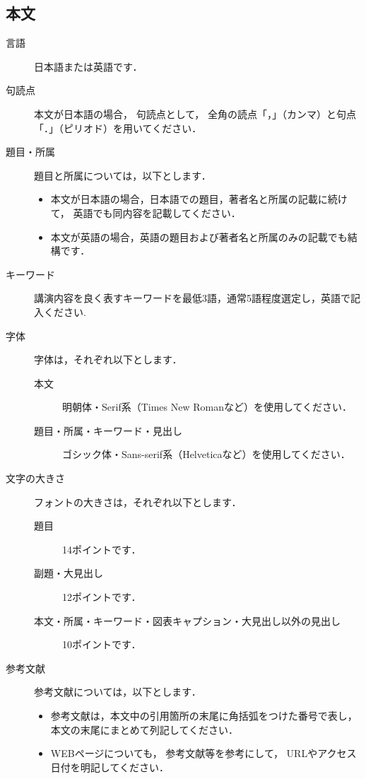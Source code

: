 \documentclass{ltjoc}
\begin{document}
\subsection{本文}
\begin{description}
\item [言語]
  日本語または英語です．
\item [句読点]
  本文が日本語の場合，
  句読点として，
  全角の読点「，」（カンマ）と句点「．」（ピリオド）を用いてください． 
\item [題目・所属]
  題目と所属については，以下とします．
  \begin{itemize}
  \item 
  本文が日本語の場合，日本語での題目，著者名と所属の記載に続けて，
  英語でも同内容を記載してください．
  \item 
  本文が英語の場合，英語の題目および著者名と所属のみの記載でも結構です．
  \end{itemize}
\item [キーワード]
  講演内容を良く表すキーワードを最低3語，通常5語程度選定し，英語で記入ください.
\item [字体]
  字体は，それぞれ以下とします．
  \begin{description}
  \item 
    [本文]
    明朝体・Serif系（Times New Romanなど）を使用してください．
  \item 
    [題目・所属・キーワード・見出し]
    ゴシック体・Sans-serif系（Helveticaなど）を使用してください．
  \end{description}
\item [文字の大きさ]
  フォントの大きさは，それぞれ以下とします．
  \begin{description}
  \item [題目]
    14ポイントです．
  \item [副題・大見出し]
    12ポイントです．
  \item [本文・所属・キーワード・図表キャプション・大見出し以外の見出し]
    10ポイントです．
  \end{description}
\item [参考文献]
  参考文献については，以下とします．
  \begin{itemize}
  \item 
  参考文献は，本文中の引用箇所の末尾に角括弧をつけた番号で表し，
  本文の末尾にまとめて列記してください．
  \item 
  WEBページについても，
  参考文献\cite{SIST02-200}等を参考にして，
  URLやアクセス日付を明記してください．
  \end{itemize}
\end{description}
\end{document}
